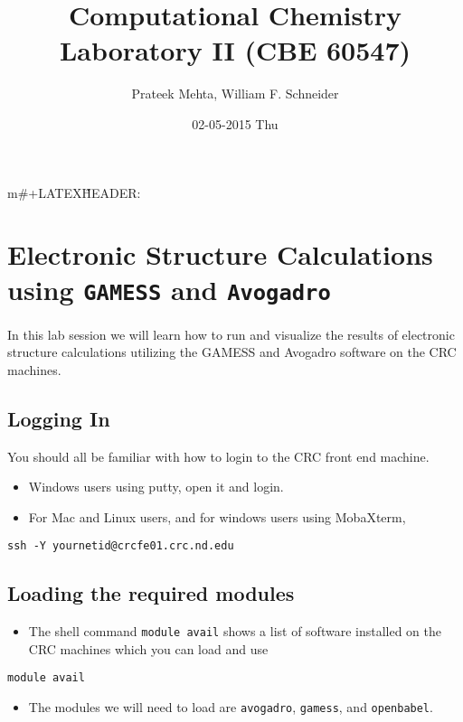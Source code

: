 \documentclass[11pt]{article}
\author{Prateek Mehta, William F. Schneider}
\date{02-05-2015 Thu}
\title{Computational Chemistry Laboratory II (CBE 60547)}
\begin{document}
m\#+LATEX\~HEADER: \usepackage{enumerate}
\maketitle

\section{Electronic Structure Calculations using \texttt{GAMESS} and \texttt{Avogadro}}
\label{sec:org4be049b}

In this lab session we will learn how to run and visualize the results of electronic structure calculations utilizing the GAMESS and Avogadro software on the CRC machines.

\subsection{Logging In}
\label{sec:org972f8a7}

You should all be familiar with how to login to the CRC front end machine.

\begin{itemize}
\item Windows users using putty, open it and login.

\item For Mac and Linux users, and for windows users using MobaXterm,
\end{itemize}

\begin{verbatim}
ssh -Y yournetid@crcfe01.crc.nd.edu
\end{verbatim}

\subsection{Loading the required modules}
\label{sec:org413beaf}

\begin{itemize}
\item The shell command \texttt{module avail} shows a list of software installed on the CRC machines which you can load and use
\end{itemize}

\begin{verbatim}
module avail
\end{verbatim}


\begin{itemize}
\item The modules we will need to load are \texttt{avogadro}, \texttt{gamess}, and \texttt{openbabel}.
\end{itemize}
\end{document}
